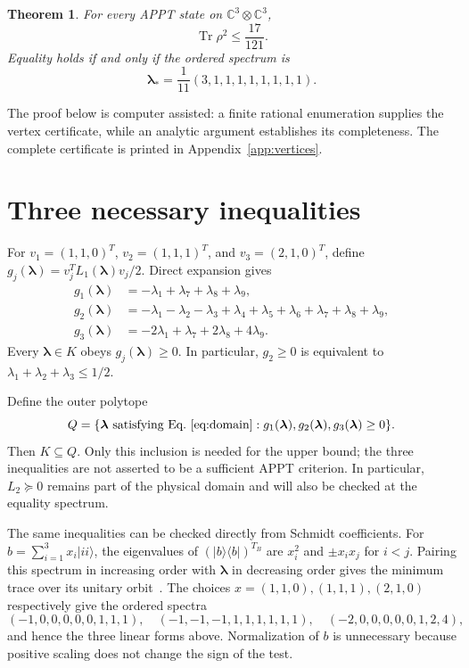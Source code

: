 \documentclass[aps,pra,onecolumn,notitlepage,10pt,amsmath,amssymb,longbibliography,nofootinbib]{revtex4-2}
\newtheorem{theorem}{Theorem}
\newcommand{\Tr}{\operatorname{Tr}}
\newcommand{\C}{\mathbb{C}}
\newcommand{\lam}{\boldsymbol{\lambda}}
\begin{document}
\begin{theorem}
\label{thm:main}
For every APPT state on $\C^3\otimes\C^3$,
\begin{equation}
 \Tr\rho^2\leq\frac{17}{121}.
 \label{eq:main}
\end{equation}
Equality holds if and only if the ordered spectrum is
\begin{equation}
 \lam_* = \frac1{11}(3,1,1,1,1,1,1,1,1).
 \label{eq:star}
\end{equation}
\end{theorem}

The proof below is computer assisted: a finite rational enumeration supplies
the vertex certificate, while an analytic argument establishes its completeness.
The complete certificate is printed in Appendix~\ref{app:vertices}.

\section{Three necessary inequalities}
\label{sec:cuts}

For $v_1=(1,1,0)^T$, $v_2=(1,1,1)^T$, and $v_3=(2,1,0)^T$, define
$g_j(\lam)=v_j^TL_1(\lam)v_j/2$. Direct expansion gives
\begin{align}
 g_1(\lam)&=-\lambda_1+\lambda_7+\lambda_8+\lambda_9,\label{eq:g1}\\
 g_2(\lam)&=-\lambda_1-\lambda_2-\lambda_3+
              \lambda_4+\lambda_5+\lambda_6+\lambda_7+\lambda_8+\lambda_9,
              \label{eq:g2}\\
 g_3(\lam)&=-2\lambda_1+\lambda_7+2\lambda_8+4\lambda_9.\label{eq:g3}
\end{align}
Every $\lam\in K$ obeys $g_j(\lam)\geq0$. In particular,
$g_2\geq0$ is equivalent to $\lambda_1+\lambda_2+\lambda_3\leq1/2$.

Define the outer polytope
\begin{equation}
 Q=\{\lam\text{ satisfying Eq.~\eqref{eq:domain}}:
                    g_1(\lam),g_2(\lam),g_3(\lam)\geq0\}.
 \label{eq:Q}
\end{equation}
Then $K\subseteq Q$. Only this inclusion is needed for the upper bound; the
three inequalities are not asserted to be a sufficient APPT criterion.
In particular, $L_2\succeq0$ remains part of the physical domain and will also
be checked at the equality spectrum.

The same inequalities can be checked directly from Schmidt coefficients.
For $b=\sum_{i=1}^3 x_i|ii\rangle$, the eigenvalues of
$(|b\rangle\langle b|)^{T_B}$ are $x_i^2$ and $\pm x_ix_j$ for $i<j$.
Pairing this spectrum in increasing order with $\lam$ in decreasing order
gives the minimum trace over its unitary orbit~\cite{Hildebrand}.
The choices $x=(1,1,0),(1,1,1),(2,1,0)$ respectively give the ordered spectra
\begin{equation}
 (-1,0,0,0,0,0,1,1,1),\quad
 (-1,-1,-1,1,1,1,1,1,1),\quad
 (-2,0,0,0,0,0,1,2,4),
 \label{eq:schmidtchecks}
\end{equation}
and hence the three linear forms above. Normalization of $b$ is unnecessary
because positive scaling does not change the sign of the test.
\end{document}
